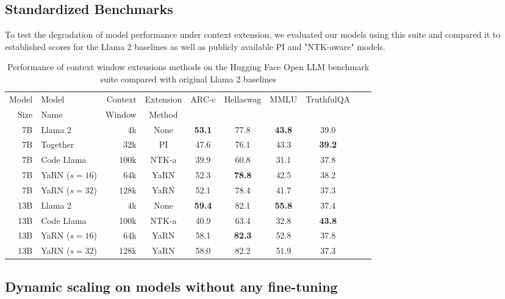 \documentclass{article} %
\begin{document}
\subsection{Standardized Benchmarks}\label{appendix:standard}

To test the degradation of model performance under context extension, we evaluated our models using this suite and compared it to established scores for the Llama 2 baselines as well as publicly available PI and "NTK-aware" models.


\begin{table}[h]
    \centering
    \begin{tabular}{rlrccccccc}
       \toprule
       Model & Model & Context & Extension & \multirow{2}{*}{ARC-c} & \multirow{2}{*}{Hellaswag} & \multirow{2}{*}{MMLU} & \multirow{2}{*}{TruthfulQA}  \\
       Size &   Name &  Window &  Method \\
       \midrule
        7B &       Llama 2 &   4k & None & {\bf 53.1} & 77.8 & {\bf 43.8} & 39.0 \\
       \midrule
        7B &      Together &  32k &   PI & 47.6 & 76.1 & 43.3 & {\bf 39.2} \\
        7B &    Code Llama & 100k &  NTK-a & 39.9 & 60.8 & 31.1 & 37.8 \\
        7B & YaRN ($s=16$) &  64k & YaRN & 52.3 & {\bf 78.8} & 42.5 & 38.2 \\
        7B & YaRN ($s=32$) & 128k & YaRN & 52.1 & 78.4 & 41.7 & 37.3 \\
       \midrule
       13B &       Llama 2 &   4k & None & {\bf 59.4} & 82.1 & {\bf 55.8} & 37.4 \\
       \midrule
       13B &    Code Llama & 100k &  NTK-a & 40.9 & 63.4 & 32.8 & {\bf 43.8} \\
       13B & YaRN ($s=16$) &  64k & YaRN & 58.1 & {\bf 82.3} & 52.8 & 37.8 \\
       13B & YaRN ($s=32$) & 128k & YaRN & 58.0 & 82.2 & 51.9 & 37.3 \\  
       \bottomrule
    \end{tabular}
    \caption{\small Performance of context window extensions methods on the Hugging Face Open LLM benchmark suite compared with original Llama 2 baselines}
    \label{tab:open_llm}
\end{table}


\newpage

\subsection{Dynamic scaling on models without any fine-tuning}\label{appendix:dynamic}
\end{document}
